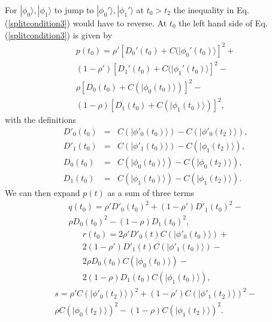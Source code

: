 \documentclass[twocolumn,amsmath,amssymb]{revtex4-1}
\begin{document}
For $|\phi_0 \rangle , |\phi_1 \rangle $
to jump to
$|\phi_0' \rangle , |\phi_1' \rangle $ at $t_0 > t_2$ the inequality in Eq. (\ref{splitcondition3})
would have to reverse.
At  $t_0$ the left hand side of Eq. (\ref{splitcondition3}) is given
by 
\begin{multline}
  \label{lefthand1}
  p(t_0) = \rho' [ D_0'( t_0) + C(|\phi_0'( t_0) \rangle ] ^2 + \\
(1-\rho') [ D_1'( t_0) + C(|\phi_1'( t_0) \rangle ] ^2 - \\
  \rho [D_0( t_0) + C( |\phi_0(t_0) \rangle )]^2 - \\
  (1-\rho) [D_1( t_0) + C( |\phi_1(t_0) \rangle )]^2,
\end{multline}
with the definitions
\begin{subequations}
  \begin{eqnarray}
 \label{defD0p}
    D'_0(t_0) & = &  C( |\phi'_0(t_0) \rangle ) - C(|\phi'_0(t_2) \rangle ) ,\\
 \label{defD1p}
    D'_1(t_0) & = &  C( |\phi'_1(t_0) \rangle ) - C(|\phi_1(t_2) \rangle ), \\
 \label{defD01}
    D_0(t_0) & = &  C( |\phi_0(t_0) \rangle ) - C(|\phi_0(t_2) \rangle ) ,\\
 \label{defD11}
    D_1(t_0) & = &  C( |\phi_1(t_0) \rangle ) - C(|\phi_1(t_2) \rangle ).
  \end{eqnarray}
\end{subequations}
We can then expand $p(t)$ as a sum of three terms
\begin{multline}
  \label{defq1}
  q( t_0) = \rho' D'_0(t_0)^2 + (1 - \rho') D'_1(t_0)^2 -\\
  \rho D_0(t_0)^2 - (1 - \rho) D_1(t_0)^2,
\end{multline}
\begin{multline}
  \label{defr1}
  r( t_0) = 2\rho' D'_0(t)C(|\phi'_0(t_0) \rangle ) + \\
  2 (1 - \rho') D'_1(t)C(|\phi'_1(t_0) \rangle ) - \\
  2\rho D_0(t_0)C(|\phi_0(t_0) \rangle ) - \\2 (1 - \rho) D_1(t_0)C(|\phi_1(t_0) \rangle ),
\end{multline}
\begin{multline}
  \label{defs1}
  s =  \rho' C(|\phi'_0(t_2) \rangle )^2 + (1 - \rho')C(|\phi'_1(t_2) \rangle )^2 - \\
  \rho C(|\phi_0(t_2) \rangle )^2 - (1 - \rho)C(|\phi_1(t_2) \rangle )^2.
\end{multline}
\end{document}
